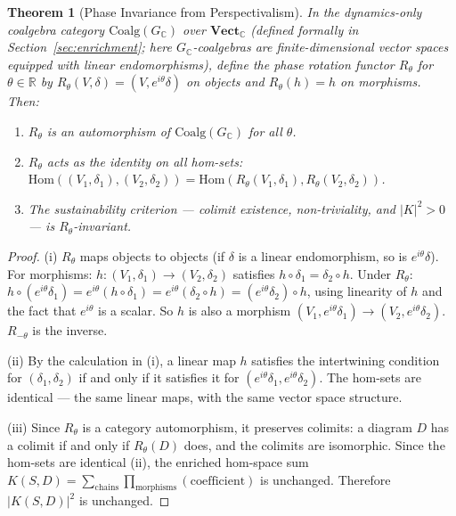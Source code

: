 \documentclass[12pt,a4paper]{article}
\newtheorem{theorem}{Theorem}
\begin{document}
\begin{theorem}[Phase Invariance from Perspectivalism]
\label{thm:phase-invariance}
In the dynamics-only coalgebra category $\text{Coalg}(G_\mathbb{C})$ over $\mathbf{Vect}_{\mathbb{C}}$ (defined formally in Section~\ref{sec:enrichment}; here $G_\mathbb{C}$-coalgebras are finite-dimensional vector spaces equipped with linear endomorphisms), define the phase rotation functor $R_\theta$ for $\theta \in \mathbb{R}$ by $R_\theta(V, \delta) = (V, e^{i\theta}\delta)$ on objects and $R_\theta(h) = h$ on morphisms. Then:

\begin{enumerate}
  \item[(i)] $R_\theta$ is an automorphism of $\text{Coalg}(G_\mathbb{C})$ for all $\theta$.

  \item[(ii)] $R_\theta$ acts as the identity on all hom-sets: $\text{Hom}((V_1, \delta_1), (V_2, \delta_2)) = \text{Hom}(R_\theta(V_1, \delta_1), R_\theta(V_2, \delta_2))$.

  \item[(iii)] The sustainability criterion --- colimit existence, non-triviality, and $|K|^2 > 0$ --- is $R_\theta$-invariant.
\end{enumerate}
\end{theorem}

\begin{proof}
(i) $R_\theta$ maps objects to objects (if $\delta$ is a linear endomorphism, so is $e^{i\theta}\delta$). For morphisms: $h : (V_1, \delta_1) \to (V_2, \delta_2)$ satisfies $h \circ \delta_1 = \delta_2 \circ h$. Under $R_\theta$: $h \circ (e^{i\theta}\delta_1) = e^{i\theta}(h \circ \delta_1) = e^{i\theta}(\delta_2 \circ h) = (e^{i\theta}\delta_2) \circ h$, using linearity of $h$ and the fact that $e^{i\theta}$ is a scalar. So $h$ is also a morphism $(V_1, e^{i\theta}\delta_1) \to (V_2, e^{i\theta}\delta_2)$. $R_{-\theta}$ is the inverse.

(ii) By the calculation in (i), a linear map $h$ satisfies the intertwining condition for $(\delta_1, \delta_2)$ if and only if it satisfies it for $(e^{i\theta}\delta_1, e^{i\theta}\delta_2)$. The hom-sets are identical --- the same linear maps, with the same vector space structure.

(iii) Since $R_\theta$ is a category automorphism, it preserves colimits: a diagram $D$ has a colimit if and only if $R_\theta(D)$ does, and the colimits are isomorphic. Since the hom-sets are identical (ii), the enriched hom-space sum $K(S,D) = \sum_{\text{chains}} \prod_{\text{morphisms}} (\text{coefficient})$ is unchanged. Therefore $|K(S,D)|^2$ is unchanged.
\end{proof}
\end{document}

